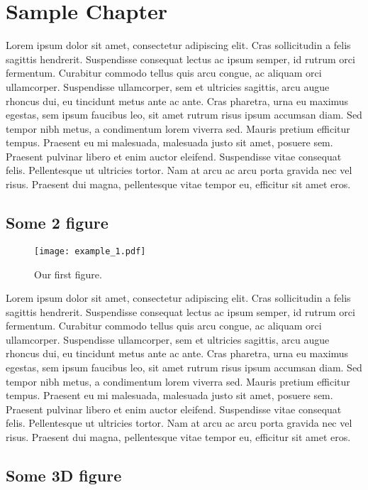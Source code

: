 \documentclass[10pt]{report}
\begin{document}
\chapter{Sample Chapter}

Lorem ipsum dolor sit amet, consectetur adipiscing elit. Cras sollicitudin a felis sagittis hendrerit. Suspendisse consequat lectus ac ipsum semper, id rutrum orci fermentum. Curabitur commodo tellus quis arcu congue, ac aliquam orci ullamcorper. Suspendisse ullamcorper, sem et ultricies sagittis, arcu augue rhoncus dui, eu tincidunt metus ante ac ante. Cras pharetra, urna eu maximus egestas, sem ipsum faucibus leo, sit amet rutrum risus ipsum accumsan diam. Sed tempor nibh metus, a condimentum lorem viverra sed. Mauris pretium efficitur tempus. Praesent eu mi malesuada, malesuada justo sit amet, posuere sem. Praesent pulvinar libero et enim auctor eleifend. Suspendisse vitae consequat felis. Pellentesque ut ultricies tortor. Nam at arcu ac arcu porta gravida nec vel risus. Praesent dui magna, pellentesque vitae tempor eu, efficitur sit amet eros.

\section{Some 2 figure}

\begin{figure}[H]
	\centering
	\texttt{[image: example\_1.pdf]}
	\caption{Our first figure.}
\end{figure}

Lorem ipsum dolor sit amet, consectetur adipiscing elit. Cras sollicitudin a felis sagittis hendrerit. Suspendisse consequat lectus ac ipsum semper, id rutrum orci fermentum. Curabitur commodo tellus quis arcu congue, ac aliquam orci ullamcorper. Suspendisse ullamcorper, sem et ultricies sagittis, arcu augue rhoncus dui, eu tincidunt metus ante ac ante. Cras pharetra, urna eu maximus egestas, sem ipsum faucibus leo, sit amet rutrum risus ipsum accumsan diam. Sed tempor nibh metus, a condimentum lorem viverra sed. Mauris pretium efficitur tempus. Praesent eu mi malesuada, malesuada justo sit amet, posuere sem. Praesent pulvinar libero et enim auctor eleifend. Suspendisse vitae consequat felis. Pellentesque ut ultricies tortor. Nam at arcu ac arcu porta gravida nec vel risus. Praesent dui magna, pellentesque vitae tempor eu, efficitur sit amet eros.

\section{Some 3D figure}
\end{document}
